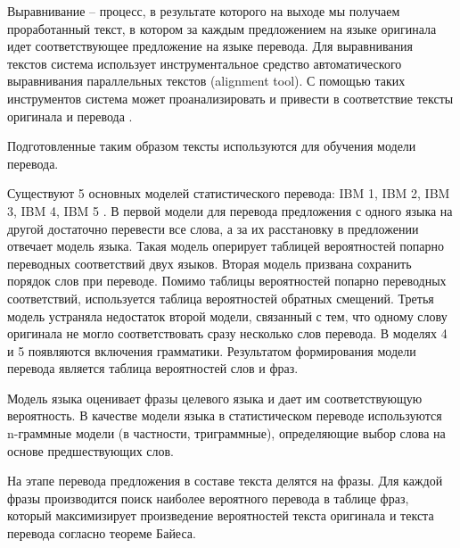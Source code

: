 \documentclass{bmstu}
\begin{document}
	Выравнивание – процесс, в результате которого на выходе мы
	получаем проработанный текст, в котором за каждым предложением на
	языке оригинала идет соответствующее предложение на языке перевода. Для выравнивания текстов система использует инструментальное средство
	автоматического выравнивания параллельных текстов (alignment tool). С
	помощью таких инструментов система может проанализировать и привести в
	соответствие тексты оригинала и перевода \cite{smt2}. 
	
	Подготовленные таким образом тексты используются для обучения модели перевода.
	
	Существуют 5 основных моделей статистического перевода: IBM 1, IBM 2, IBM 3, IBM 4, IBM 5 \cite{smt}. В первой модели для перевода предложения с одного языка на другой достаточно перевести все слова, а за их расстановку в предложении отвечает модель языка. Такая модель оперирует таблицей вероятностей попарно переводных соответствий двух языков. Вторая модель призвана сохранить порядок слов при переводе. Помимо таблицы вероятностей попарно переводных соответствий, используется таблица вероятностей обратных смещений. Третья модель устраняла недостаток второй модели, связанный с тем, что одному слову оригинала не могло соответствовать сразу несколько слов перевода. В моделях 4 и 5 появляются включения грамматики. Результатом формирования модели перевода является таблица вероятностей слов и фраз. 
	
	Модель языка оценивает фразы целевого языка и дает им соответствующую вероятность. В качестве модели языка в статистическом переводе используются n-граммные модели (в частности, триграммные), определяющие выбор слова на основе предшествующих слов.
	
	На этапе перевода предложения в составе текста делятся на фразы. Для каждой фразы производится поиск наиболее вероятного перевода в таблице фраз, который максимизирует произведение вероятностей текста оригинала и текста перевода согласно теореме Байеса. 
	
\makebibliography
	
\end{document}
